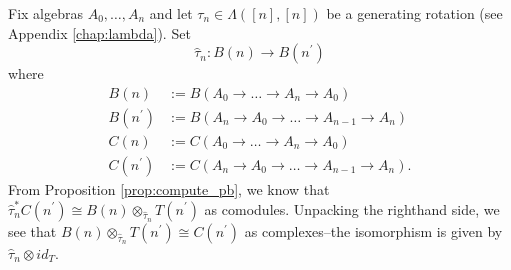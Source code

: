 %
\begin{eg}
\label{eg:pb5}
Fix algebras $A_0, \dots, A_n$ and let 
$\tau_n \in \Lambda([n],[n])$ 
be a generating rotation (see Appendix 
\ref{chap:lambda}). Set
$$
\hat{\tau}_n: B(n) \to 
B(n^\prime)
$$
where 
\begin{align*}
B(n) &:= 
B(A_0 \to \dots \to A_n \to A_0)\\
B(n^\prime) &:= 
B(A_n \to A_0 \to \dots \to A_{n-1} \to A_n)\\
C(n) &:= 
C(A_0 \to \dots \to A_n \to A_0)\\
C(n^\prime) &:= 
C(A_n \to A_0 \to \dots \to A_{n-1} \to A_n).
\end{align*}
From Proposition \ref{prop:compute_pb}, we 
know that $\hat{\tau}_n^*C(n^\prime) 
\cong B(n) \otimes_{\hat{\tau}_n} 
T(n^\prime)$ as comodules. Unpacking the 
righthand side, we see that $B(n) 
\otimes_{\hat{\tau}_n} T(n^\prime) 
\cong C(n^\prime)$ as complexes--the 
isomorphism is given by $\hat{\tau}_n 
\otimes id_{T}$.
\end{eg}
